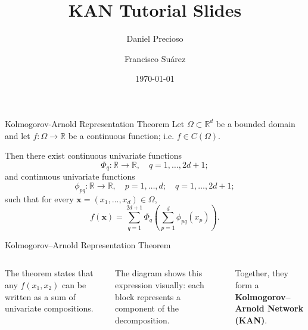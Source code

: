\documentclass[aspectratio=169]{beamer}
\title[Kolmogorov–Arnold Networks]{KAN Tutorial Slides}
\author[Daniel Precioso \and Francisco Suárez]{Daniel Precioso \and Francisco Suárez}
\date{\today}
\begin{document}
\maketitle

\begin{frame}{Kolmogorov-Arnold Representation Theorem}
Let $ \Omega \subset \mathbb{R}^d $ be a bounded domain and let $ f: \Omega \rightarrow \mathbb{R} $ be a continuous function; i.e. $ f \in C(\Omega) $.

Then there exist continuous univariate functions
$$
\Phi_q: \mathbb{R} \to \mathbb{R}, \quad q = 1, \dots, 2d+1;
$$
and continuous univariate functions
$$
\phi_{pq}: \mathbb{R} \to \mathbb{R}, \quad p = 1, \dots, d; \quad q = 1, \dots, 2d+1;
$$
such that for every $\mathbf{x} = (x_1, \dots, x_d) \in \Omega$,
$$
f(\mathbf{x}) = \sum_{q=1}^{2d+1} \Phi_q \left( \sum_{p=1}^d \phi_{pq}(x_p) \right).
$$
\end{frame}


\begin{frame}{Kolmogorov–Arnold Representation Theorem}
	
	\begin{columns}[T,onlytextwidth]
		
		\centering
		\resizebox{!}{0.8\textheight}{}
		
		The theorem states that any $f(x_1, x_2)$ can be written as a sum of univariate compositions.
		
		\vspace{0.8em}
		The diagram shows this expression visually: each block represents a component of the decomposition.
		
		\vspace{0.8em}
		Together, they form a \textbf{Kolmogorov–Arnold Network (KAN)}.
		
	\end{columns}
	
\end{frame}

\end{document}
